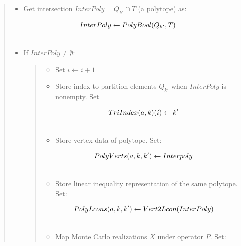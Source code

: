 \documentclass[a4paper,10pt,english]{sphinxmanual}
\begin{document}
{\begin{minipage}{0.95\linewidth}
\begin{itemize}
\begin{quote}
\begin{itemize}
\item {} 
Get intersection $InterPoly = Q_{k'} \cap T$ (a polytope) as:

\end{itemize}
\begin{gather}
\begin{split}InterPoly \leftarrow PolyBool(Q_{k'},T)\end{split}\notag\\\begin{split}\end{split}\notag
\end{gather}\begin{itemize}
\item {} 
If $InterPoly \neq \emptyset$:
\begin{quote}
\begin{itemize}
\item {} 
Set $i \leftarrow i + 1$

\item {} 
Store index to partition elements $Q_{k'}$ when $InterPoly$ is nonempty. Set

\end{itemize}
\begin{gather}
\begin{split}TriIndex(a,k)(i) \gets k'\end{split}\notag\\\begin{split}\end{split}\notag
\end{gather}\begin{itemize}
\item {} 
Store vertex data of polytope. Set:

\end{itemize}
\begin{gather}
\begin{split}PolyVerts(a,k,k') \gets Interpoly\end{split}\notag\\\begin{split}\end{split}\notag
\end{gather}\begin{itemize}
\item {} 
Store linear inequality representation of the same polytope. Set:

\end{itemize}
\begin{gather}
\begin{split}PolyLcons(a,k,k') \gets Vert2Lcon(InterPoly)\end{split}\notag\\\begin{split}\end{split}\notag
\end{gather}\begin{itemize}
\item {} 
Map Monte Carlo realizations $X$ under operator $P$. Set:


\end{itemize}
\end{quote}
\end{itemize}
\end{quote}
\end{itemize}
\end{minipage}}
\end{document}
